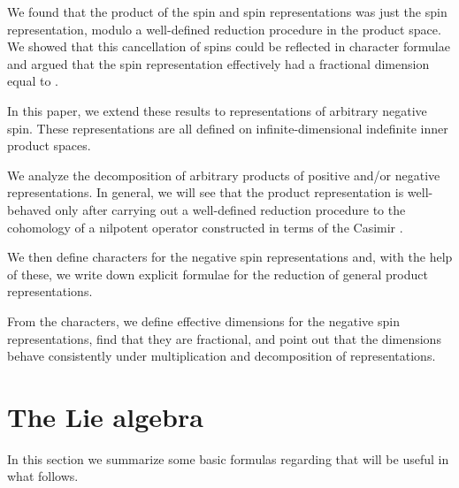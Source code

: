 \documentclass[a4paper,dvips,12pt]{article}
\providecommand {\half} {{1 \over 2}}
\begin{document}
    We found that
    the product of the spin \myHighlight{$\half$}\coordHE{} and spin \myHighlight{$-\half$}\coordHE{}
    representations was
    just the spin \coordHE{} representation, modulo a
    well-defined reduction procedure in the product space.  We
    showed that this cancellation of spins could be reflected in
    character formulae and argued that the spin \myHighlight{$-\half$}\coordHE{}
    representation effectively had a fractional dimension equal to
    \myHighlight{$\half$}\coordHE{}.

    In this paper, we extend these results to
    representations of arbitrary negative spin.  These
    representations are all defined on infinite-dimensional
    indefinite inner product spaces.

    We analyze the decomposition
    of arbitrary products of positive and/or negative representations.
    In general, we will see that the product representation
    is well-behaved only after carrying out a well-defined reduction procedure
    to the cohomology of a nilpotent operator \coordHE{} constructed in
    terms of
    the Casimir \coordHE{}.

    We then define characters for the negative spin
    representations and, with the help of these, we write down
    explicit formulae for the reduction of general product
    representations.

    From the characters, we define effective dimensions for
    the negative spin representations, find that they are
    fractional, and point out that the dimensions behave
    consistently under multiplication and decomposition of
    representations.

    \section{The Lie algebra \coordHE{}}

    In this section we summarize some basic formulas regarding \coordHE{}
    that will be
    useful in what follows.
\end{document}
